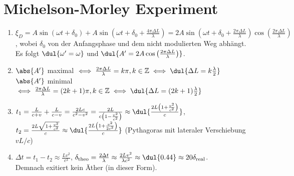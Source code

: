 \documentclass{article}
\begin{document}
\section{Michelson-Morley Experiment}
\begin{enumerate}[label=\alph*)]
    \item $\xi_D = A \sin(\omega t + \delta_0) + A \sin\left(\omega t + \delta_0 +\frac{4 \pi \Delta L}{\lambda}\right) = 2A \sin\left(\omega t + \delta_0 + \frac{2 \pi \Delta L}{\lambda}\right) \cos\left(\frac{2 \pi \Delta L}{\lambda}\right)$, wobei $\delta_0$ von der Anfangsphase und dem nicht modulierten Weg abhängt. \\
    Es folgt $\dul{\omega' = \omega}$ und $\dul{A' = 2A \cos\left(\frac{2 \pi \Delta L}{\lambda}\right)}$.  
    
    \item $\abs{A'}$ maximal $\iff \frac{2 \pi \Delta L}{\lambda} = k \pi, k \in \mathbb{Z} \iff \dul{\Delta L = k \frac{\lambda}{2}}$ \\
    $\abs{A'}$ minimal $\iff \frac{2 \pi \Delta L}{\lambda} = (2k+1) \pi, k \in \mathbb{Z} \iff \dul{\Delta L = (2k+1) \frac{\lambda}{2}}$  
    
    \item $t_1 = \frac{L}{c + v} + \frac{L}{c - v} 
    = \frac{2Lc}{c^2 - v^2}
    = \frac{2L}{c \left(1 - \frac{v^2}{c^2}\right)}
    \approx \dul{\frac{2L \left(1 + \frac{v^2}{c^2}\right)}{c}}$, \\
    $t_2 = \frac{2L \sqrt{1 + \frac{v^2}{c^2}}}{c} 
    \approx \dul{\frac{2L\left(1 + \frac{v^2}{2c^2}\right)}{c}}$ (Pythagoras mit lateraler Verschiebung $vL/c$) \\

    \item $\Delta t = t_1 - t_2 \approx \frac{Lv^2}{c^3}$, \quad
    $\delta_\text{theo} = \frac{2\Delta t}{\lambda} \approx \frac{2Lv^2}{\lambda c^2} \approx \dul{0.44} \approx 20\delta_\text{real}$. \\
    Demnach exitiert kein Äther (in dieser Form). 

\end{enumerate}
\end{document}
